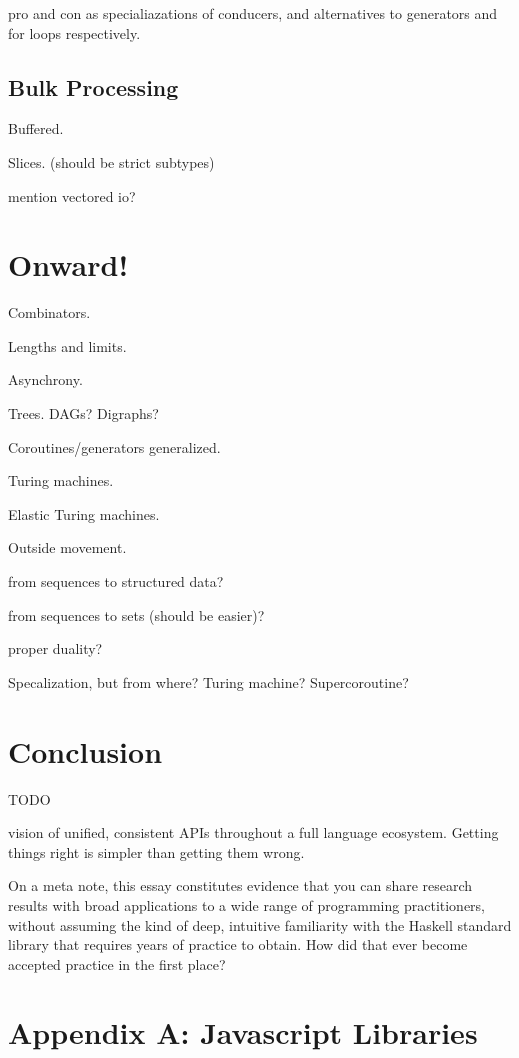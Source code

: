 \documentclass[sigplan,screen,10pt,anonymous,review]{acmart}
\begin{document}
pro and con as specialiazations of conducers, and alternatives to generators and for loops respectively.

\subsection{Bulk Processing}

Buffered.

Slices. (should be strict subtypes)

mention vectored io?

\section{Onward!}\label{fun}

Combinators.

Lengths and limits.

Asynchrony.

Trees. DAGs? Digraphs?

Coroutines/generators generalized.

Turing machines.

Elastic Turing machines.

Outside movement.

from sequences to structured data?

from sequences to sets (should be easier)?

proper duality?

Specalization, but from where? Turing machine? Supercoroutine?

\section{Conclusion}\label{conclusion}

TODO

vision of unified, consistent APIs throughout a full language ecosystem. Getting things right is simpler than getting them wrong.

On a meta note, this essay constitutes evidence that you can share research results with broad applications to a wide range of programming practitioners, without assuming the kind of deep, intuitive familiarity with the Haskell standard library that requires years of practice to obtain. How did that ever become accepted practice in the first place?

\section{Appendix A: Javascript Libraries}\label{wtfjs}
\end{document}
